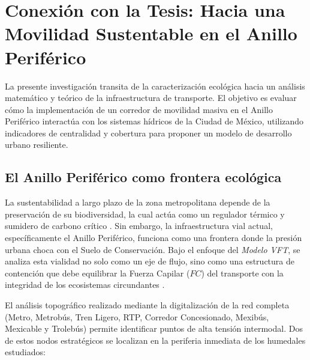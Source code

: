 
\section{Conexión con la Tesis: Hacia una Movilidad Sustentable en el Anillo Periférico}

La presente investigación transita de la caracterización ecológica hacia un análisis matemático 
y teórico de la infraestructura de transporte. El objetivo es evaluar cómo la implementación de un 
corredor de movilidad masiva en el Anillo Periférico interactúa con los sistemas hídricos de la 
Ciudad de México, utilizando indicadores de centralidad y cobertura para proponer un modelo de desarrollo 
urbano resiliente.


\subsection{El Anillo Periférico como frontera ecológica}

La sustentabilidad a largo plazo de la zona metropolitana depende de la preservación de su biodiversidad, 
la cual actúa como un regulador térmico y sumidero de carbono crítico \cite{sedema2022programa}. 
Sin embargo, la infraestructura vial actual, específicamente el Anillo Periférico, funciona como una frontera 
donde la presión urbana choca con el Suelo de Conservación. Bajo el enfoque del \textit{Modelo VFT}, se analiza 
esta vialidad no solo como un eje de flujo, sino como una estructura de contención que debe equilibrar la 
Fuerza Capilar ($FC$) del transporte con la integridad de los ecosistemas circundantes \cite{garibaldi2023vft}.

El análisis topográfico realizado mediante la digitalización de la red completa (Metro, Metrobús, Tren Ligero, RTP, 
Corredor Concesionado, Mexibús, Mexicable y Trolebús) permite identificar puntos de alta tensión intermodal. 
Dos de estos nodos estratégicos se localizan en la periferia inmediata de los humedales estudiados:

